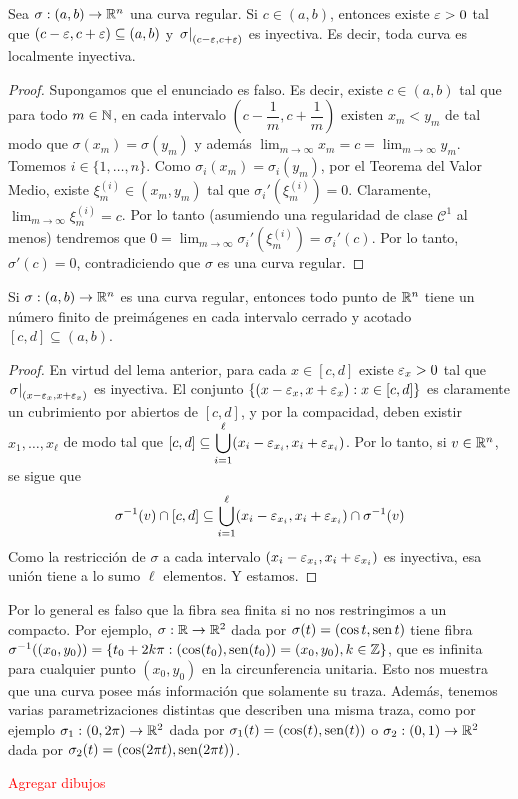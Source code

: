 \begin{lem}
Sea $\sigma:(a,b)\to\mathbb{R}^n$ una curva regular. Si $c\in (a,b)$, entonces existe $\varepsilon>0$ tal que $(c-\varepsilon,c+\varepsilon)\subseteq (a,b)$ y $\left.\sigma\right|_{(c-\varepsilon,c+\varepsilon)}$ es inyectiva. Es decir, toda curva es localmente inyectiva.
\begin{proof}
Supongamos que el enunciado es falso. Es decir, existe $c\in (a,b)$ tal que para todo $m\in\mathbb{N}$, en cada intervalo $\left(c-\dfrac{1}{m},c+\dfrac{1}{m}\right)$ existen $x_m<y_m$ de tal modo que $\sigma(x_m)=\sigma(y_m)$ y además $\displaystyle\lim_{m\to\infty}x_m = c = \displaystyle\lim_{m\to \infty}y_m$. Tomemos $i\in\{1,\ldots , n\}$. Como $\sigma_i(x_m)=\sigma_i(y_m)$, por el Teorema del Valor Medio, existe $\xi_m^{(i)}\in (x_m,y_m)$ tal que $\sigma_i'(\xi_m^{(i)})=0$. Claramente, $\lim_{m\to\infty}\xi_m^{(i)}=c$. Por lo tanto (asumiendo una regularidad de clase $\mathscr{C}^1$ al menos) tendremos que $0=\displaystyle\lim_{m\to\infty}\sigma_i'(\xi_m^{(i)})=\sigma_i'(c)$. Por lo tanto, $\sigma'(c)=0$, contradiciendo que $\sigma$ es una curva regular.
\end{proof}
\end{lem}

\begin{cor}
Si $\sigma:(a,b)\to\mathbb{R}^n$ es una curva regular, entonces todo punto de $\mathbb{R}^n$ tiene un número finito de preimágenes en cada intervalo cerrado y acotado $[c,d]\subseteq (a,b)$.
\begin{proof}
En virtud del lema anterior, para cada $x\in [c,d]$ existe $\varepsilon_x>0$ tal que $\left.\sigma\right|_{(x-\varepsilon_x,x+\varepsilon_x)}$ es inyectiva. El conjunto $\{(x-\varepsilon_x,x+\varepsilon_x) : x\in [c,d]\}$ es claramente un cubrimiento por abiertos de $[c,d]$, y por la compacidad, deben existir $x_1,\ldots , x_\ell$ de modo tal que $[c,d]\subseteq\displaystyle\bigcup_{i=1}^{\ell} (x_i-\varepsilon_{x_i},x_i+\varepsilon_{x_i})$. Por lo tanto, si $v\in\mathbb{R}^n$, se sigue que $$\sigma^{-1}(v)\cap [c,d] \subseteq \displaystyle\bigcup_{i=1}^\ell (x_i-\varepsilon_{x_i},x_i+\varepsilon_{x_i})\cap \sigma^{-1}(v)$$ Como la restricción de $\sigma$ a cada intervalo $(x_i-\varepsilon_{x_i},x_i+\varepsilon_{x_i})$ es inyectiva, esa unión tiene a lo sumo $\ell$ elementos. Y estamos.
\end{proof}
\end{cor}

\begin{ex}
Por lo general es falso que la fibra sea finita si no nos restringimos a un compacto. Por ejemplo, $\sigma:\mathbb{R}\to\mathbb{R}^2$ dada por $\sigma(t)=(\cos t,\operatorname{sen} t)$ tiene fibra $\sigma^{-1}((x_0,y_0)) = \{t_0 + 2k\pi : (\cos(t_0),\operatorname{sen}(t_0))=(x_0,y_0), k\in\mathbb{Z}\}$, que es infinita para cualquier punto $(x_0,y_0)$ en la circunferencia unitaria. Esto nos muestra que una curva posee más información que solamente su traza. Además, tenemos varias parametrizaciones distintas que describen una misma traza, como por ejemplo $\sigma_1:(0,2\pi)\to \mathbb{R}^2$ dada por $\sigma_1(t)=(\cos(t),\operatorname{sen}(t))$ o $\sigma_2:(0,1)\to \mathbb{R}^2$ dada por $\sigma_2(t)=(\cos(2\pi t),\operatorname{sen}(2\pi t))$.

\textcolor{red}{Agregar dibujos}
\end{ex}


